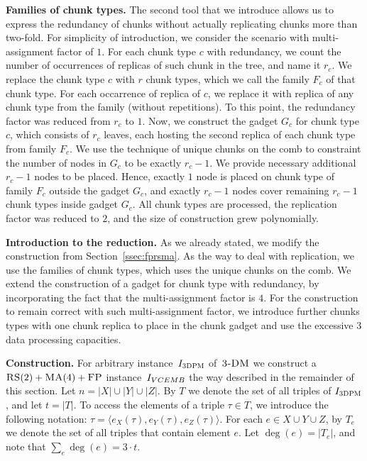 \textbf{Families of chunk types.} The second tool that we introduce allows us to express the redundancy of chunks without actually replicating chunks more than two-fold.
For simplicity of introduction, we consider the scenario with multi-assignment factor of $1$.
For each chunk type $c$ with redundancy, we count the number of occurrences of replicas of such chunk in the tree, and name it $r_c$.
We replace the chunk type $c$ with $r$ chunk types, which we call the family $F_c$ of that chunk type.
For each occarrence of replica of $c$, we replace it with replica of any chunk type from the family (without repetitions).
To this point, the redundancy factor was reduced from $r_c$ to $1$.
Now, we construct the gadget $G_c$ for chunk type $c$, which consists of $r_c$ leaves, each hosting the second replica of each chunk type from family $F_c$.
We use the technique of unique chunks on the comb to constraint the number of nodes in $G_c$ to be exactly $r_c - 1$.
We provide necessary additional $r_c-1$ nodes to be placed.
Hence, exactly $1$ node is placed on chunk type of family $F_c$ outside the gadget $G_c$, and exactly $r_c-1$ nodes cover remaining $r_c-1$ chunk types inside gadget $G_c$.
All chunk types are processed, the replication factor was reduced to $2$, and the size of construction grew polynomially.

\textbf{Introduction to the reduction.} As we already stated, we modify the construction from Section~\ref{ssec:fprsma}.
As the way to deal with replication, we use the families of chunk types, which uses the unique chunks on the comb.
We extend the construction of a gadget for chunk type with redundancy, by incorporating the fact that the multi-assignment factor is $4$.
For the construction to remain correct with such multi-assignment factor, we introduce further chunks types with one chunk replica to place in the chunk gadget and use the excessive $3$ data processing capacities.

\textbf{Construction.}
For arbitrary instance~$I_{\textsc{3DPM}}$ of~$\textsc{3-DM}$ we construct a~$\textsc{RS}(2)+\textsc{MA}(4)+\textsc{FP}$ instance~$I_{VCEMB}$ the way described in the remainder of this section.
Let $n = |X|\cup|Y|\cup|Z|$.
By $T$ we denote the set of all triples of $I_{\textsc{3DPM}}$, and let $t = |T|$.
To access the elements of a triple $\tau \in T$, we introduce the following notation: $\tau = \langle e_X(\tau), e_Y(\tau), e_Z(\tau) \rangle$.
For each $e\in X\cup Y\cup Z$, by $T_e$ we denote the set of all triples that contain element $e$.
Let $\deg(e) = |T_e|$, and note that $\sum_e \deg(e) = 3\cdot t$.

